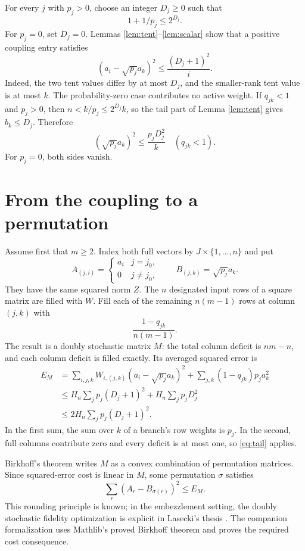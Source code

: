 \documentclass[11pt]{article}
\begin{document}
For every $j$ with $p_j>0$, choose an integer $D_j\geq0$ such that
\begin{equation}
 1+1/p_j\leq2^{D_j}.\label{eq:shift}
\end{equation}
For $p_j=0$, set $D_j=0$. Lemmas \ref{lem:tent}--\ref{lem:scalar} show that a positive coupling entry satisfies
\begin{equation}
 (a_i-\sqrt{p_j}a_k)^2\leq\frac{(D_j+1)^2}{i}.\label{eq:active}
\end{equation}
Indeed, the two tent values differ by at most $D_j$, and the smaller-rank tent value is at most $k$. The probability-zero case contributes no active weight. If $q_{jk}<1$ and $p_j>0$, then $n<k/p_j\leq2^{D_j}k$, so the tail part of Lemma \ref{lem:tent} gives $b_k\leq D_j$. Therefore
\begin{equation}
 (\sqrt{p_j}a_k)^2\leq\frac{p_jD_j^2}{k}\quad(q_{jk}<1).\label{eq:tail}
\end{equation}
For $p_j=0$, both sides vanish.

\section{From the coupling to a permutation}

Assume first that $m\geq2$. Index both full vectors by $J\times\{1,\ldots,n\}$ and put
\[
 A_{(j,i)}=\begin{cases}a_i&j=j_0,\\0&j\ne j_0,\end{cases}
 \qquad B_{(j,k)}=\sqrt{p_j}a_k.
\]
They have the same squared norm $Z$. The $n$ designated input rows of a square matrix are filled with $W$. Fill each of the remaining $n(m-1)$ rows at column $(j,k)$ with
\[
 \frac{1-q_{jk}}{n(m-1)}.
\]
The result is a doubly stochastic matrix $M$: the total column deficit is $nm-n$, and each column deficit is filled exactly. Its averaged squared error is
\begin{align}
 E_M&=\sum_{i,j,k}W_{i,(j,k)}(a_i-\sqrt{p_j}a_k)^2
       +\sum_{j,k}(1-q_{jk})p_ja_k^2\\
 &\leq H_n\sum_jp_j(D_j+1)^2+H_n\sum_jp_jD_j^2\\
 &\leq2H_n\sum_jp_j(D_j+1)^2.\label{eq:cost}
\end{align}
In the first sum, the sum over $k$ of a branch's row weights is $p_j$. In the second, full columns contribute zero and every deficit is at most one, so \eqref{eq:tail} applies.

Birkhoff's theorem writes $M$ as a convex combination of permutation matrices. Since squared-error cost is linear in $M$, some permutation $\sigma$ satisfies
\begin{equation}
 \sum_r(A_r-B_{\sigma(r)})^2\leq E_M.\label{eq:permutation}
\end{equation}
This rounding principle is known; in the embezzlement setting, the doubly stochastic fidelity optimization is explicit in Lasecki's thesis \cite{lasecki}. The companion formalization uses Mathlib's proved Birkhoff theorem and proves the required cost consequence.
\end{document}
